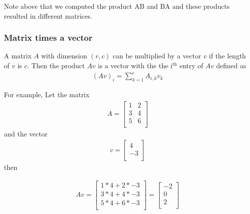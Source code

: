     Note above that we computed the product AB and BA and these products
resulted in different matrices.

    \hypertarget{matrix-times-a-vector}{%
\subsubsection{Matrix times a vector}\label{matrix-times-a-vector}}

A matrix \(A\) with dimension \((r,c)\) can be multiplied by a vector
\(v\) if the length of \(v\) is \(c\). Then the product \(Av\) is a
vector with the the i\(^{\text{th}}\) entry of \(Av\) defined as
\begin{align}
    (Av)_{i} = \sum_{k=1}^{c} A_{i,k} v_{k}
\end{align}

For example, Let the matrix \begin{align}
    A = \left [ \begin{matrix}
                   1 & 2 \\ 
                   3 & 4 \\
                   5 & 6 \\
         \end{matrix} \right ]
\end{align} and the vector \begin{align}
    v = \left [ \begin{matrix}
                   4  \\ 
                   -3  \\
         \end{matrix} \right ]
\end{align} then

\begin{align}
    Av = \left [ \begin{matrix}
                   1*4+2*-3 \\ 
                   3*4+4*-3 \\
                   5*4+6*-3 \\
         \end{matrix} \right ] = 
         \left [ \begin{matrix}
                   -2  \\ 
                   0  \\
                   2 \\
         \end{matrix} \right ]
\end{align}

